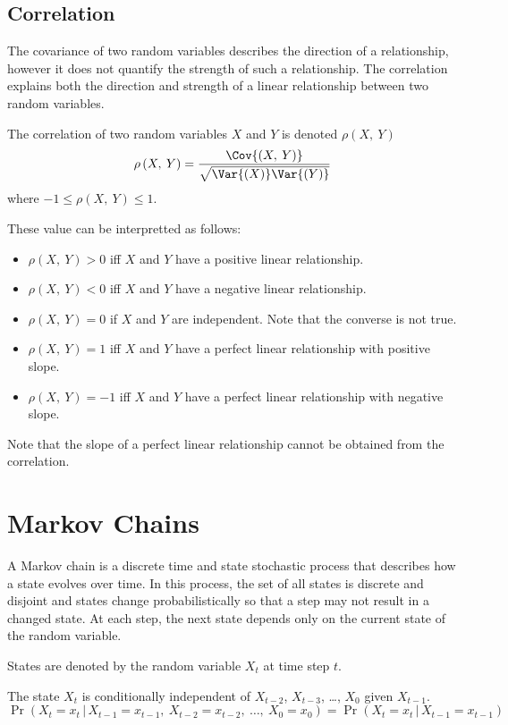 \documentclass{article}
\begin{document}
\subsection{Correlation}
The covariance of two random variables describes the direction of a relationship, however
it does not quantify the strength of such a relationship. The correlation explains both
the direction and strength of a linear relationship between two random variables.

The correlation of two random variables \(X\) and \(Y\) is denoted \(\rho\left( X,\: Y \right)\)
\begin{equation*}
    \rho\left( X,\: Y \right) = \frac{\Cov{\left( X,\: Y \right)}}{\sqrt{\Var{\left( X \right)} \Var{\left( Y \right)}}}
\end{equation*}
where \(-1 \leq \rho\left( X,\: Y \right) \leq 1\).

These value can be interpretted as follows:
\begin{itemize}
    \item \(\rho\left( X,\: Y \right) > 0\) iff \(X\) and \(Y\) have a positive linear relationship.
    \item \(\rho\left( X,\: Y \right) < 0\) iff \(X\) and \(Y\) have a negative linear relationship.
    \item \(\rho\left( X,\: Y \right) = 0\) if \(X\) and \(Y\) are independent. Note that the converse is not true.
    \item \(\rho\left( X,\: Y \right) = 1\) iff \(X\) and \(Y\) have a perfect linear relationship with positive slope.
    \item \(\rho\left( X,\: Y \right) = -1\) iff \(X\) and \(Y\) have a perfect linear relationship with negative slope.
\end{itemize}
Note that the slope of a perfect linear relationship cannot be obtained from the correlation.
\section{Markov Chains}
A Markov chain is a discrete time and state stochastic process that describes how a state evolves over time.
In this process, the set of all states is discrete and disjoint and states change probabilistically so that
a step may not result in a changed state.
At each step, the next state depends only on the current state of the random variable.

States are denoted by the random variable \(X_t\) at time step \(t\).
\begin{definition}
    The state \(X_t\) is conditionally independent of \(X_{t-2}\), \(X_{t-3}\), \dots, \(X_0\) given \(X_{t-1}\).
    \begin{equation*}
        \Pr{\left( X_t = x_t \,\vert\, X_{t-1} = x_{t-1},\: X_{t-2} = x_{t-2},\: \ldots,\: X_{0} = x_{0} \right)} = \Pr{\left( X_t = x_t \,\vert\, X_{t-1} = x_{t-1} \right)}
    \end{equation*}
\end{definition}
\end{document}
